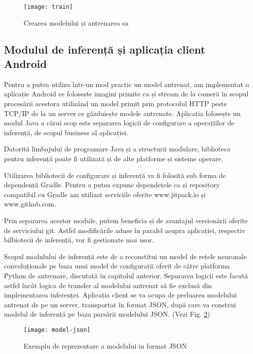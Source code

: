 	\begin{figure}[H]
		\texttt{[image: train]}
		\caption{\label{fig:train} Crearea modelului și antrenarea sa}
	\end{figure}
	
	\newpage
	\subsection{Modulul de inferență și aplicația client Android}
	
	Pentru a putea utiliza într-un mod practic un model antrenat, am implementat o aplicație Android ce folosește imagini primite ca și stream de la cameră în scopul procesării acestora utilizând un model primit prin protocolul HTTP peste TCP/IP de la un server ce găzduiește modele antrenate. 
	Aplicația folosește un modul Java a cărui scop este separarea logicii de configurare a operațiilor de inferență, de scopul business al aplicației. \newline
	
	Datorită limbajului de programare Java și a structurii modulare, biblioteca pentru inferență poate fi utilizată și de alte platforme și sisteme operare.
	
	Utilizarea bibliotecii de configurare și inferență va fi folosită sub forma de dependență Gradle. Pentru a putea expune dependețele ca și repository compatibil cu Gradle am utilizat serviciile oferite www.jitpack.io și www.github.com. 
	
	Prin separarea acestor module, putem beneficia și de avantajul versionării oferite de serviciului git. Astfel modificările aduse în paralel asupra aplicației, respectiv bilbiotecii de inferență, vor fi gestionate mai usor.
	
	Scopul modulului de inferență este de a reconstitui un model de rețele neuronale convoluționale pe baza unui model de configurații oferit de către platforma Python de antrenare, discutată în capitolul anterior. Separarea logicii este facută astfel încât logica de transfer al modelului antrenat să fie exclusă din implementarea inferenței. Aplicația client se va ocupa de preluarea modelului antrenat de pe un server, transportat în format JSON, după care va construi modelul de inferență pe baza parsării modelului JSON. (Vezi Fig. \ref{fig:model-json})
	
	\vfill
	
	\begin{figure}[H]
		\texttt{[image: model-json]}
		\caption{\label{fig:model-json} Exemplu de reprezentare a modelului in format JSON}
	\end{figure}

